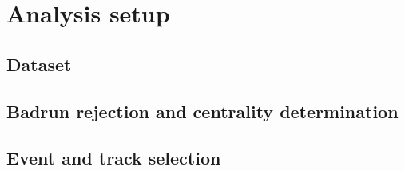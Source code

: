 
\section{Analysis setup}

\subsection{Dataset}

\blindtext

\subsection{Badrun rejection and centrality determination}

\blindtext

\subsection{Event and track selection}

\blindtext